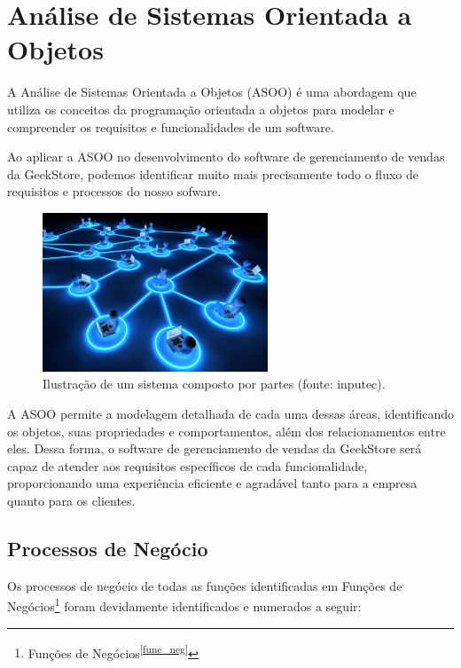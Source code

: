 \documentclass[
	12pt,				%
	openright,			%
	twoside,			%
	a4paper,			%
	english,			%
	brazil				%
	]{abntex2}
\begin{document}
\part{Análise de Sistemas Orientada a Objetos}

A Análise de Sistemas Orientada a Objetos (ASOO) é uma abordagem que utiliza os conceitos da programação orientada a objetos para modelar e compreender os requisitos e funcionalidades de um software.

Ao aplicar a ASOO no desenvolvimento do software de gerenciamento de vendas da GeekStore, podemos identificar muito mais precisamente todo o fluxo de requisitos e processos do nosso sofware.

\begin{figure}[htb]
	\centering
	\includegraphics[width=0.6\textwidth]{img/programacao-orientada-objetos-fig.jpg}
	\caption{Ilustração de um sistema composto por partes (fonte: inputec).}
	\label{fig:programacao-orientada-objetos-fig}
\end{figure}

A ASOO permite a modelagem detalhada de cada uma dessas áreas, identificando os objetos, suas propriedades e comportamentos, além dos relacionamentos entre eles. Dessa forma, o software de gerenciamento de vendas da GeekStore será capaz de atender aos requisitos específicos de cada funcionalidade, proporcionando uma experiência eficiente e agradável tanto para a empresa quanto para os clientes.


\chapter{Processos de Negócio}\label{process_negocio} 

Os processos de negócio de todas as funções identificadas em Funções de Negócios\footnote{Funções de Negócios\textsuperscript{\ref{func_neg}}} foram devidamente identificados e numerados a seguir:
\end{document}
